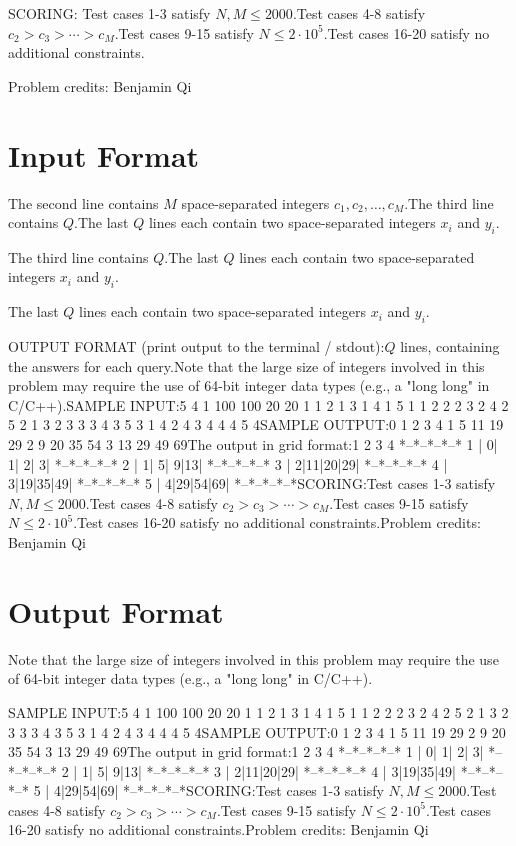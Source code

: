\documentclass[12pt]{article}
\begin{document}
SCORING:
Test cases 1-3 satisfy $N,M\le 2000$.Test cases 4-8 satisfy $c_2>c_3>\cdots>c_M$.Test cases 9-15 satisfy $N\le 2\cdot 10^5$.Test cases 16-20 satisfy no additional constraints.


Problem credits: Benjamin Qi



\section*{Input Format}
The second line contains $M$ space-separated integers $c_1,c_2,\ldots,c_M$.The third line contains $Q$.The last $Q$ lines each contain two space-separated integers $x_i$ and $y_i$.

The third line contains $Q$.The last $Q$ lines each contain two space-separated integers $x_i$ and $y_i$.

The last $Q$ lines each contain two space-separated integers $x_i$ and $y_i$.

OUTPUT FORMAT (print output to the terminal / stdout):$Q$ lines, containing the answers for each query.Note that the large size of integers involved in this problem may require the
use of 64-bit integer data types (e.g., a "long long" in C/C++).SAMPLE INPUT:5 4
1 100 100 20
20
1 1
2 1
3 1
4 1
5 1
1 2
2 2
3 2
4 2
5 2
1 3
2 3
3 3
4 3
5 3
1 4
2 4
3 4
4 4
5 4SAMPLE OUTPUT:0
1
2
3
4
1
5
11
19
29
2
9
20
35
54
3
13
29
49
69The output in grid format:1  2  3  4
  *--*--*--*--*
1 | 0| 1| 2| 3|
  *--*--*--*--*
2 | 1| 5| 9|13|
  *--*--*--*--*
3 | 2|11|20|29|
  *--*--*--*--*
4 | 3|19|35|49|
  *--*--*--*--*
5 | 4|29|54|69|
  *--*--*--*--*SCORING:Test cases 1-3 satisfy $N,M\le 2000$.Test cases 4-8 satisfy $c_2>c_3>\cdots>c_M$.Test cases 9-15 satisfy $N\le 2\cdot 10^5$.Test cases 16-20 satisfy no additional constraints.Problem credits: Benjamin Qi

\section*{Output Format}
Note that the large size of integers involved in this problem may require the
use of 64-bit integer data types (e.g., a "long long" in C/C++).

SAMPLE INPUT:5 4
1 100 100 20
20
1 1
2 1
3 1
4 1
5 1
1 2
2 2
3 2
4 2
5 2
1 3
2 3
3 3
4 3
5 3
1 4
2 4
3 4
4 4
5 4SAMPLE OUTPUT:0
1
2
3
4
1
5
11
19
29
2
9
20
35
54
3
13
29
49
69The output in grid format:1  2  3  4
  *--*--*--*--*
1 | 0| 1| 2| 3|
  *--*--*--*--*
2 | 1| 5| 9|13|
  *--*--*--*--*
3 | 2|11|20|29|
  *--*--*--*--*
4 | 3|19|35|49|
  *--*--*--*--*
5 | 4|29|54|69|
  *--*--*--*--*SCORING:Test cases 1-3 satisfy $N,M\le 2000$.Test cases 4-8 satisfy $c_2>c_3>\cdots>c_M$.Test cases 9-15 satisfy $N\le 2\cdot 10^5$.Test cases 16-20 satisfy no additional constraints.Problem credits: Benjamin Qi
\end{document}
